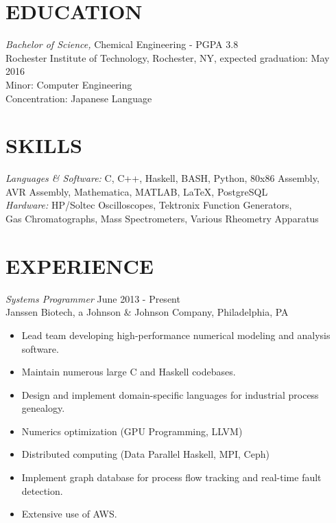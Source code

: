 \documentclass[line,margin]{res}
\begin{document}
\address{262 Academy Street, Mexico, NY 13114}
\address{(315) 391-7268 - tmw4661@rit.edu}

\begin{resume}

\section{EDUCATION} {\sl Bachelor of Science,} Chemical Engineering - PGPA 3.8 \\
Rochester Institute of Technology, Rochester, NY,
expected graduation: May 2016 \\
Minor: Computer Engineering \\
Concentration: Japanese Language \\
\section{SKILLS} {\sl Languages \& Software:} C, C++, Haskell, BASH, Python, 80x86 Assembly, \\AVR Assembly, Mathematica, MATLAB, \LaTeX, PostgreSQL \\
                 {\sl Hardware:} HP/Soltec Oscilloscopes, Tektronix Function Generators, \\Gas Chromatographs, Mass Spectrometers, Various Rheometry Apparatus\\

\section{EXPERIENCE} {\sl Systems Programmer} \hfill June 2013 - Present \\
		Janssen Biotech, a Johnson \& Johnson Company,
		Philadelphia, PA
		\begin{itemize}  \itemsep -2pt
		\item   Lead team developing high-performance numerical modeling and analysis software.
		\item   Maintain numerous large C and Haskell codebases.
		\item   Design and implement domain-specific languages for industrial process genealogy.
		\item   Numerics optimization (GPU Programming, LLVM)
		\item   Distributed computing (Data Parallel Haskell, MPI, Ceph)
		\item   Implement graph database for process flow tracking and real-time fault detection.
		\item   Extensive use of AWS.
		\end{itemize}


\end{resume}
\end{document}

